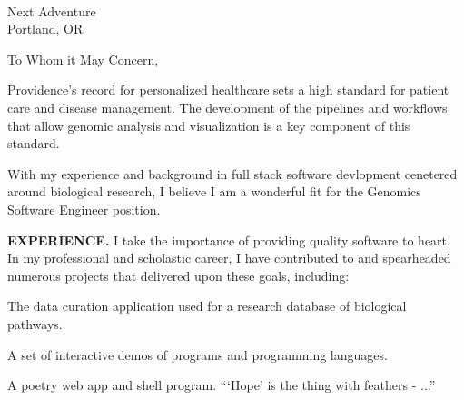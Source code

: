 



\textcolor{my-grey}{\dotfill}
\bigbreak

{\DTMtoday}\\
Next Adventure\\
Portland, OR

\vspace*{2\baselineskip}

To Whom it May Concern,

\vspace*{2\baselineskip}

Providence's record for personalized healthcare sets a high standard for patient care and disease management. The development of the pipelines and workflows that allow genomic analysis and visualization is a key component of this standard.

\vspace*{\baselineskip}

With my experience and background in full stack software devlopment cenetered around biological research, I believe I am a wonderful fit for the Genomics Software Engineer position.

\vspace*{\baselineskip}

\textbf{EXPERIENCE.} I take the importance of providing quality software to heart. In my professional and scholastic career, I have contributed to and spearheaded numerous projects that delivered upon these goals, including:

\begin{itemize}[label=$\triangleright$]
The data curation application used for a research database of biological pathways.

A set of interactive demos of programs and programming languages.

A poetry web app and shell program. ```Hope' is the thing with feathers - ...''

\end{itemize}

\vspace*{\baselineskip}


